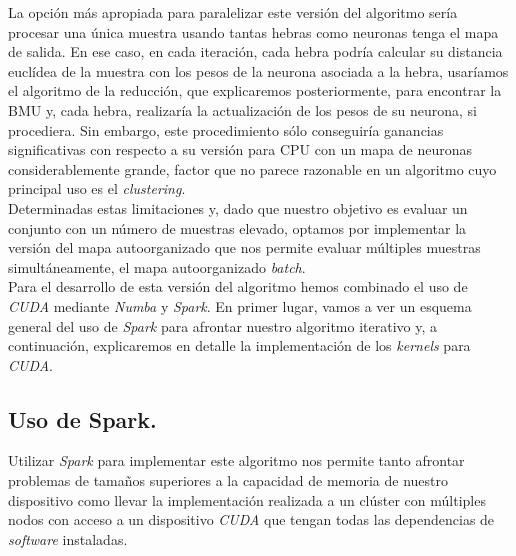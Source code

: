 La opción más apropiada para paralelizar este versión del algoritmo sería procesar una única muestra usando tantas hebras como neuronas tenga el mapa de salida. En ese caso, en cada iteración, cada hebra podría calcular su distancia euclídea de la muestra con los pesos de la neurona asociada a la hebra, usaríamos el algoritmo de la reducción, que explicaremos posteriormente, para encontrar la BMU y, cada hebra, realizaría la actualización de los pesos de su neurona, si procediera. Sin embargo, este procedimiento sólo conseguiría ganancias significativas con respecto a su versión para CPU con un mapa de neuronas considerablemente grande, factor que no parece razonable en un algoritmo cuyo principal uso es el \textit{clustering}.\\

Determinadas estas limitaciones y, dado que nuestro objetivo es evaluar un conjunto con un número de muestras elevado, optamos por implementar la versión del mapa autoorganizado que nos permite evaluar múltiples muestras simultáneamente, el mapa autoorganizado \textit{batch}.\\


Para el desarrollo de esta versión del algoritmo hemos combinado el uso de \textit{CUDA} mediante \textit{Numba} y \textit{Spark}. En primer lugar, vamos a ver un esquema general del uso de \textit{Spark} para afrontar nuestro algoritmo iterativo y, a continuación, explicaremos en detalle la implementación de los \textit{kernels} para \textit{CUDA}.

\subsection{Uso de Spark.}
Utilizar \textit{Spark} para implementar este algoritmo nos permite tanto afrontar problemas de tamaños superiores a la capacidad de memoria de nuestro dispositivo como llevar la implementación realizada a un clúster con múltiples nodos con acceso a un dispositivo \textit{CUDA} que tengan todas las dependencias de \textit{software} instaladas.\\

